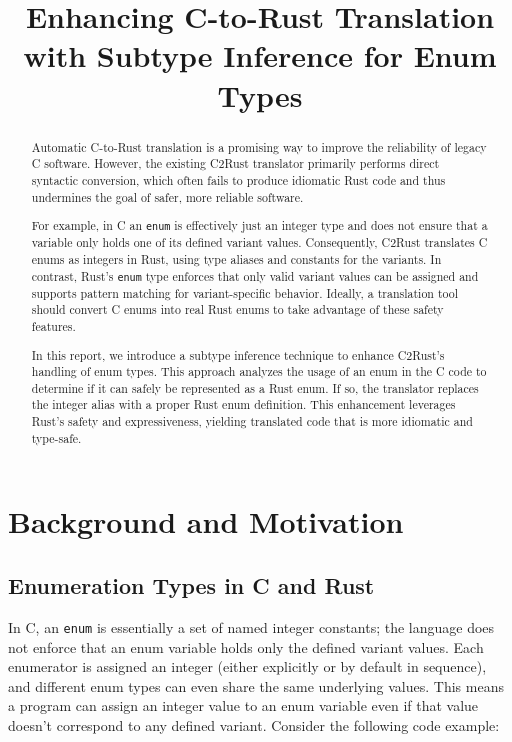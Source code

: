 \documentclass[10pt,conference]{IEEEtran}
\begin{document}
\title{Enhancing C-to-Rust Translation with Subtype Inference for Enum Types}

\author{
}

\maketitle

\begin{abstract}
Automatic C-to-Rust translation is a promising way to improve the reliability of legacy C software. However, the existing C2Rust translator primarily performs direct syntactic conversion, which often fails to produce idiomatic Rust code and thus undermines the goal of safer, more reliable software.

For example, in C an \texttt{enum} is effectively just an integer type and does not ensure that a variable only holds one of its defined variant values. Consequently, C2Rust translates C enums as integers in Rust, using type aliases and constants for the variants. In contrast, Rust's \texttt{enum} type enforces that only valid variant values can be assigned and supports pattern matching for variant-specific behavior. Ideally, a translation tool should convert C enums into real Rust enums to take advantage of these safety features.

In this report, we introduce a subtype inference technique to enhance C2Rust's handling of enum types. This approach analyzes the usage of an enum in the C code to determine if it can safely be represented as a Rust enum. If so, the translator replaces the integer alias with a proper Rust enum definition. This enhancement leverages Rust's safety and expressiveness, yielding translated code that is more idiomatic and type-safe.
\end{abstract}

\section{Background and Motivation}

\subsection{Enumeration Types in C and Rust}
In C, an \texttt{enum} is essentially a set of named integer constants; the language does not enforce that an enum variable holds only the defined variant values. Each enumerator is assigned an integer (either explicitly or by default in sequence), and different enum types can even share the same underlying values. This means a program can assign an integer value to an enum variable even if that value doesn't correspond to any defined variant. Consider the following code example:
\end{document}
